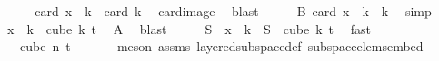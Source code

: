 \begin{isabellebody}
\ \ \isamarkupfalse%
\ \isamarkupfalse%
\ {\isachardoublequoteopen}card\ {\isacharparenleft}{\kern0pt}x\ {\isacharbackquote}{\kern0pt}\ {\isacharbraceleft}{\kern0pt}{\isachardot}{\kern0pt}{\isachardot}{\kern0pt}k{\isacharbraceright}{\kern0pt}{\isacharparenright}{\kern0pt}\ {\isacharequal}{\kern0pt}\ card\ {\isacharbraceleft}{\kern0pt}{\isachardot}{\kern0pt}{\isachardot}{\kern0pt}k{\isacharbraceright}{\kern0pt}{\isachardoublequoteclose}\ \isamarkupfalse%
\ card{\isacharunderscore}{\kern0pt}image\ \isamarkupfalse%
\ blast\isanewline
\ \ \isamarkupfalse%
\ \isamarkupfalse%
\ B{\isacharcolon}{\kern0pt}\ {\isachardoublequoteopen}card\ {\isacharparenleft}{\kern0pt}x\ {\isacharbackquote}{\kern0pt}\ {\isacharbraceleft}{\kern0pt}{\isachardot}{\kern0pt}{\isachardot}{\kern0pt}k{\isacharbraceright}{\kern0pt}{\isacharparenright}{\kern0pt}\ {\isacharequal}{\kern0pt}\ k{\isacharplus}{\kern0pt}{}{\isachardoublequoteclose}\ \isamarkupfalse%
\ simp\isanewline
\ \ \isamarkupfalse%
\ {\isachardoublequoteopen}x\ {\isacharbackquote}{\kern0pt}\ {\isacharbraceleft}{\kern0pt}{\isachardot}{\kern0pt}{\isachardot}{\kern0pt}k{\isacharbraceright}{\kern0pt}\ {\isasymsubseteq}\ cube\ k\ {\isacharparenleft}{\kern0pt}t{\isacharplus}{\kern0pt}{}{\isacharparenright}{\kern0pt}{\isachardoublequoteclose}\ \isamarkupfalse%
\ A\ \isamarkupfalse%
\ blast\isanewline
\ \ \isamarkupfalse%
\ \isamarkupfalse%
\ {\isachardoublequoteopen}S\ {\isacharbackquote}{\kern0pt}\ x\ {\isacharbackquote}{\kern0pt}\ {\isacharbraceleft}{\kern0pt}{\isachardot}{\kern0pt}{\isachardot}{\kern0pt}k{\isacharbraceright}{\kern0pt}\ {\isasymsubseteq}\ S\ {\isacharbackquote}{\kern0pt}\ cube\ k\ {\isacharparenleft}{\kern0pt}t{\isacharplus}{\kern0pt}{}{\isacharparenright}{\kern0pt}{\isachardoublequoteclose}\ \isamarkupfalse%
\ fast\isanewline
\ \ \isamarkupfalse%
\ \isamarkupfalse%
\ {\isachardoublequoteopen}{\isachardot}{\kern0pt}{\isachardot}{\kern0pt}{\isachardot}{\kern0pt}\ {\isasymsubseteq}\ cube\ n\ {\isacharparenleft}{\kern0pt}t{\isacharplus}{\kern0pt}{}{\isacharparenright}{\kern0pt}{\isachardoublequoteclose}\ \isanewline
\ \ \ \ \isamarkupfalse%
\ {\isacharparenleft}{\kern0pt}meson\ assms{\isacharparenleft}{\kern0pt}{}{\isacharparenright}{\kern0pt}\ layered{\isacharunderscore}{\kern0pt}subspace{\isacharunderscore}{\kern0pt}def\ subspace{\isacharunderscore}{\kern0pt}elems{\isacharunderscore}{\kern0pt}embed{\isacharparenright}{\kern0pt}\isanewline

\end{isabellebody}
